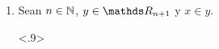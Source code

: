 \begin{demo}
\begin{enumerate}
\begin{longderivation}
              \\
            \equiv\\
          \end{longderivation}
    \item Sean $n\in\mathbb{N}$, $y\in\R_{n+1}$ y $x\in y$.
          \begin{longderivation}<.9>
              \\
            \\
              \\
            \To\\
          \end{longderivation}
  \end{enumerate}
\end{demo}